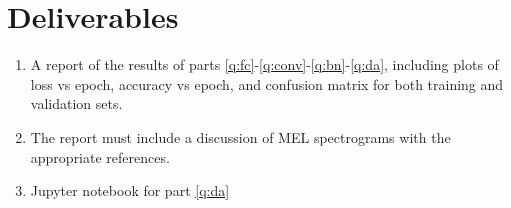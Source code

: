\documentclass{article}
\begin{document}
\section{Deliverables}
\begin{enumerate}
    \item A report of the results of parts \ref{q:fc}-\ref{q:conv}-\ref{q:bn}-\ref{q:da}, including plots of loss vs epoch, accuracy vs epoch, and confusion matrix for both training and validation sets.
    \item The report must include a discussion of MEL spectrograms with the appropriate references.
    \item Jupyter notebook for part \ref{q:da}
\end{enumerate}
\end{document}
